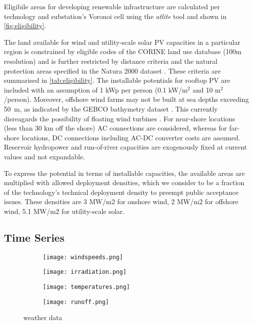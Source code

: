 Eligibile areas for developing renewable infrastructure are calculated per
technology and substation's Voronoi cell using the \textit{atlite} tool
\citeS{} and shown in \cref{fig:eligibility}.

The land available for wind and utility-scale solar PV capacities in a
particular region is constrained by eligible codes of the CORINE land use
database (100m resolution) \citeS{} and is further restricted by distance
criteria and the natural protection areas specified in the Natura 2000 dataset
\citeS{}. These criteria are summarised in \cref{tab:eligibility}. The
installable potentials for rooftop PV are included with an assumption of 1 kWp
per person (0.1 kW/m$^2$ and 10 m$^2$/person). Moreover, offshore wind farms may
not be built at sea depths exceeding \SI{50}{\metre}, as indicated by the GEBCO
bathymetry dataset \citeS{}. This currently disreagards the possibility of
floating wind turbines
.
For near-shore locations (less than 30 km off the shore) AC connections are
considered, whereas for far-shore locations, DC connections including AC-DC
converter costs are assumed. Reservoir hydropower and run-of-river capacities
are exogenously fixed at current values and not expandable.

To express the potential in terms of installable capacities, the available areas
are multiplied with allowed deployment densities, which we consider to be a
fraction of the technology's technical deployment density to preempt public
acceptance issues. These densities are 3 MW/m$2$ for onshore wind, 2 MW/m$2$ for
offshore wind, 5.1 MW/m$2$ for utility-scale solar.


\subsection{Time Series}
\label{sec:si:renewable-ts}


\begin{figure}
    \centering
        \begin{subfigure}[t]{0.49\textwidth}
            \centering
        \texttt{[image: windspeeds.png]}
    \end{subfigure}
    \begin{subfigure}[t]{0.49\textwidth}
        \centering
        \texttt{[image: irradiation.png]}
    \end{subfigure}
    \begin{subfigure}[t]{0.49\textwidth}
        \centering
        \texttt{[image: temperatures.png]}
    \end{subfigure}
    \begin{subfigure}[t]{0.49\textwidth}
        \centering
        \texttt{[image: runoff.png]}
    \end{subfigure}
    \caption{weather data}
    \label{fig:weather-data}
\end{figure}


